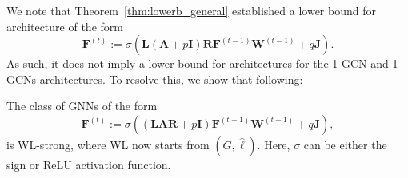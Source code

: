 We note that Theorem~\ref{thm:lowerb_general} established a lower bound for 
architecture of the form 
$$
\mathbf{F}^{(t)}:=\sigma\left(\mathbf{L}(\mathbf{A}+p\mathbf{I})\mathbf{R}\mathbf{F}^{(t-1)}\mathbf{W}^{(t-1)} + q\mathbf{J}\right).$$
As such, it does not imply a lower bound for architectures for the 1-GCN and 1-GCNs architectures. To resolve this, we show that following:
\begin{theorem}\label{thm:GCNlowerb}
The class of GNNs of the form
\begin{equation}
\mathbf{F}^{(t)}:=\sigma\left((\mathbf{L}\mathbf{A}\mathbf{R}+p\mathbf{I})\mathbf{F}^{(t-1)}\mathbf{W}^{(t-1)} + q\mathbf{J}\right), \label{eq:architecture_lb_GCN}
\end{equation}
is WL-strong, where WL now starts from $(G,\hat{\pmb{\ell}})$. Here, $\sigma$ can be either the sign or ReLU activation function.
\end{theorem}
